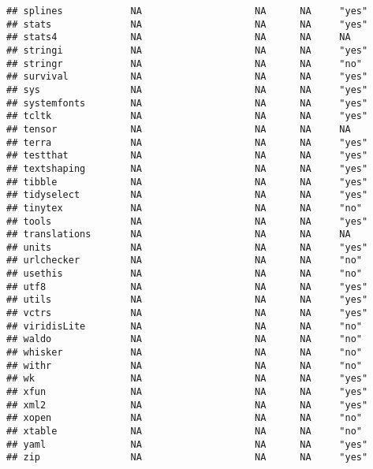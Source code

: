 \documentclass[
]{article}
\begin{document}
\begin{verbatim}
## splines            NA                    NA      NA     "yes"           
## stats              NA                    NA      NA     "yes"           
## stats4             NA                    NA      NA     NA              
## stringi            NA                    NA      NA     "yes"           
## stringr            NA                    NA      NA     "no"            
## survival           NA                    NA      NA     "yes"           
## sys                NA                    NA      NA     "yes"           
## systemfonts        NA                    NA      NA     "yes"           
## tcltk              NA                    NA      NA     "yes"           
## tensor             NA                    NA      NA     NA              
## terra              NA                    NA      NA     "yes"           
## testthat           NA                    NA      NA     "yes"           
## textshaping        NA                    NA      NA     "yes"           
## tibble             NA                    NA      NA     "yes"           
## tidyselect         NA                    NA      NA     "yes"           
## tinytex            NA                    NA      NA     "no"            
## tools              NA                    NA      NA     "yes"           
## translations       NA                    NA      NA     NA              
## units              NA                    NA      NA     "yes"           
## urlchecker         NA                    NA      NA     "no"            
## usethis            NA                    NA      NA     "no"            
## utf8               NA                    NA      NA     "yes"           
## utils              NA                    NA      NA     "yes"           
## vctrs              NA                    NA      NA     "yes"           
## viridisLite        NA                    NA      NA     "no"            
## waldo              NA                    NA      NA     "no"            
## whisker            NA                    NA      NA     "no"            
## withr              NA                    NA      NA     "no"            
## wk                 NA                    NA      NA     "yes"           
## xfun               NA                    NA      NA     "yes"           
## xml2               NA                    NA      NA     "yes"           
## xopen              NA                    NA      NA     "no"            
## xtable             NA                    NA      NA     "no"            
## yaml               NA                    NA      NA     "yes"           
## zip                NA                    NA      NA     "yes"           

\end{verbatim}
\end{document}
